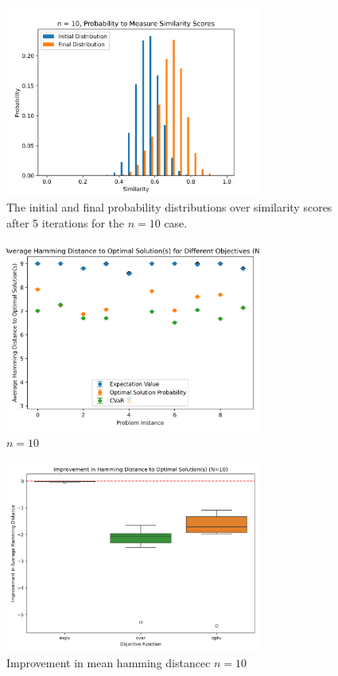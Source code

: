 \begin{figure}
\centering
\includegraphics[width=0.75\textwidth]{Figs/n=10_Similarity_scores.png}
\caption{The initial and final probability distributions over similarity scores after 5 iterations for the $n=10$ case.}
\label{fig:similarity_scores}
\end{figure}

\begin{figure}
\centering
\includegraphics[width=0.75\textwidth]{Figs/avg_hamming_distance_comparison.png}
\caption{$n=10$}
\label{fig:all_hams}
\end{figure}

\begin{figure}
\centering
\includegraphics[width=0.75\textwidth]{Figs/hamming_distance_improvement_boxplot.png}
\caption{Improvement in mean hamming distancec $n=10$}
\label{fig:ham_improvement}
\end{figure}

